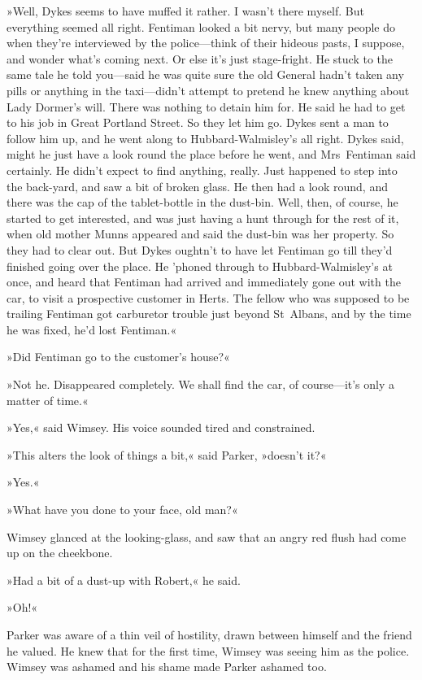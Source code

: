 »Well, Dykes seems to have muffed it rather. I wasn't there myself. But everything seemed all right. Fentiman looked a bit nervy, but many people do when they're interviewed by the police—think of their hideous pasts, I suppose, and wonder what's coming next. Or else it's just stage-fright. He stuck to the same tale he told you—said he was quite sure the old General hadn't taken any pills or anything in the taxi—didn't attempt to pretend he knew anything about Lady Dormer's will. There was nothing to detain him for. He said he had to get to his job in Great Portland Street. So they let him go. Dykes sent a man to follow him up, and he went along to Hubbard-Walmisley's all right. Dykes said, might he just have a look round the place before he went, and Mrs~Fentiman said certainly. He didn't expect to find anything, really. Just happened to step into the back-yard, and saw a bit of broken glass. He then had a look round, and there was the cap of the tablet-bottle in the dust-bin. Well, then, of course, he started to get interested, and was just having a hunt through for the rest of it, when old mother Munns appeared and said the dust-bin was her property. So they had to clear out. But Dykes oughtn't to have let Fentiman go till they'd finished going over the place. He 'phoned through to Hubbard-Walmisley's at once, and heard that Fentiman had arrived and immediately gone out with the car, to visit a prospective customer in Herts. The fellow who was supposed to be trailing Fentiman got carburetor trouble just beyond St~Albans, and by the time he was fixed, he'd lost Fentiman.«

»Did Fentiman go to the customer's house?«

»Not he. Disappeared completely. We shall find the car, of course—it's only a matter of time.«

»Yes,« said Wimsey. His voice sounded tired and constrained.

»This alters the look of things a bit,« said Parker, »doesn't it?«

»Yes.«

»What have you done to your face, old man?«

Wimsey glanced at the looking-glass, and saw that an angry red flush had come up on the cheekbone.

»Had a bit of a dust-up with Robert,« he said.

»Oh!«

Parker was aware of a thin veil of hostility, drawn between himself and the friend he valued. He knew that for the first time, Wimsey was seeing him as the police. Wimsey was ashamed and his shame made Parker ashamed too.

